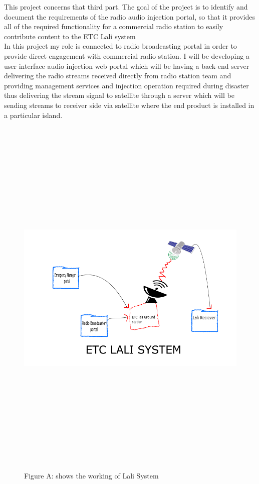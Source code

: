 This project concerns that third part. The goal of the project is to identify and document the requirements of the radio audio injection portal, so that it provides all of the required functionality for a commercial radio station to easily contribute content to the ETC Lali system\\

In this project my role is connected to radio broadcasting portal in order to provide direct engagement with commercial radio station. I will be developing a user interface audio injection web portal which will be having a back-end server delivering the radio streams received directly from radio station team and providing management services and injection operation required during disaster thus delivering the stream signal to satellite through a server which will be sending streams to receiver side via satellite where the end product is installed in a particular island.\\
\begin{figure}
\begin{centering}
\includegraphics[width=16cm,height=18cm,keepaspectratio]{Figures/2.png}
\caption{Figure A: shows the working of Lali System}
\label{radio-transmitter-injection-portal}
\end{centering}
\end{figure}
